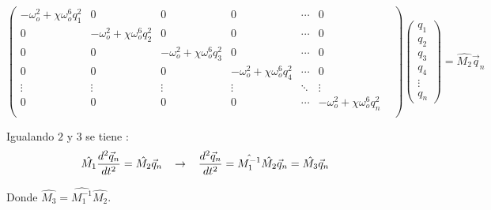 \documentclass[11pt,letterpaper]{article}
\begin{document}
\begin{equation}
\left(
\begin{matrix}
- \omega_{o}^{2} + \chi \omega_{o}^{6} q_{1}^{2} & 0 & 0 & 0 & \cdots & 0 \\
0  & - \omega_{o}^{2} + \chi \omega_{o}^{6} q_{2}^{2} & 0 & 0  & \cdots & 0 \\
0 & 0 & - \omega_{o}^{2} + \chi \omega_{o}^{6} q_{3}^{2} & 0 & \cdots & 0 \\
0 & 0 & 0 & - \omega_{o}^{2} + \chi \omega_{o}^{6} q_{4}^{2} & \cdots & 0 \\
\vdots & \vdots & \vdots & \vdots & \ddots & \vdots & \\
0 & 0 & 0 & 0& \cdots &- \omega_{o}^{2} + \chi \omega_{o}^{6} q_{n}^{2}\\     
\end{matrix} \right) \left( \begin{matrix}
q_{1}\\
q_{2}\\
q_{3}\\
q_{4}\\
\vdots\\
q_{n}
\end{matrix} \right) = \hat{M_{2}} \vec{q}_{n}
\end{equation}
\par 
Igualando $2$ y $3$ se tiene : 
\begin{equation}
\hat{M_{1}} \dfrac{d^{2} \vec{q}_{n}}{dt^{2}} = \hat{M_{2}} \vec{q}_{n} \hspace*{0.3 cm} \rightarrow \hspace*{0.3 cm}\dfrac{d^{2} \vec{q}_{n}}{dt^{2}} = \hat{M_{1}^{-1}} \hat{M_{2}} \vec{q}_{n} =  \hat{M_{3}} \vec{q}_{n}
\end{equation}
\par 
Donde $\hat{M_{3}}=\hat{M_{1}^{-1}} \hat{M_{2}}$. 
\end{document}
